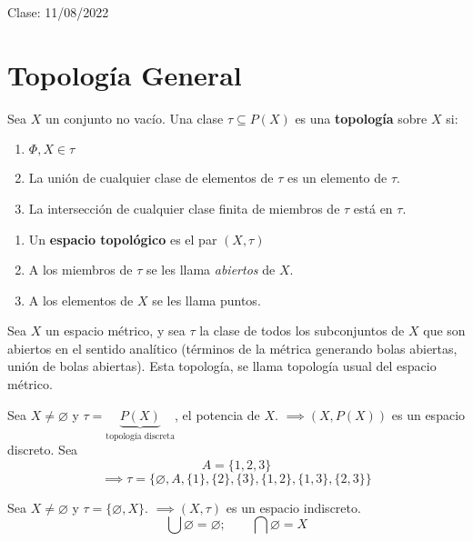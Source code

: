 Clase: 11/08/2022

\section{Topología General}

\begin{definicion}
    Sea $X$ un conjunto no vacío. Una clase $\tau\subseteq P(X)$ es una \textbf{topología} sobre $X$ si: 
    \begin{enumerate}
        \item $\Phi,X\in \tau$
        \item La unión de cualquier clase de elementos de $\tau$ es un elemento de $\tau$. 
        \item La intersección de cualquier clase finita de miembros de $\tau$ está en $\tau$.
    \end{enumerate}
\end{definicion}
\begin{nota}
    \begin{enumerate}
        \item Un \textbf{espacio topológico} es el par $(X,\tau)$
        \item A los miembros de $\tau$ se les llama \textit{abiertos} de $X$. 
        \item A los elementos de $X$ se les llama puntos. 
    \end{enumerate}
    
\end{nota}

\begin{ejemplo}
    Sea $X$ un espacio métrico, y sea $\tau$ la clase de todos los subconjuntos de $X$ que son abiertos en el sentido analítico (términos de la métrica generando bolas abiertas, unión de bolas abiertas). Esta topología, se llama topología usual del espacio métrico. 
\end{ejemplo}

\begin{ejemplo}
    Sea $X\neq \varnothing$ y $\tau = \underbrace{P(X)}_{\text{topología discreta}}$, el potencia de $X$. $\implies (X, P(X))$ es un espacio discreto.
    Sea 
    $$A=\{1,2,3\}$$
    $$\implies \tau =\{\varnothing,A,\{1\},\{2\},\{3\},\{1,2\},\{1,3\},\{2,3\}\}$$ 
\end{ejemplo}

\begin{ejemplo}
    Sea $X\neq \varnothing$ y $\tau =\{\varnothing,X\}$. $\implies (X,\tau)$ es un espacio indiscreto. 
    $$\bigcup \varnothing = \varnothing;\qquad \bigcap \varnothing =X$$
\end{ejemplo}

